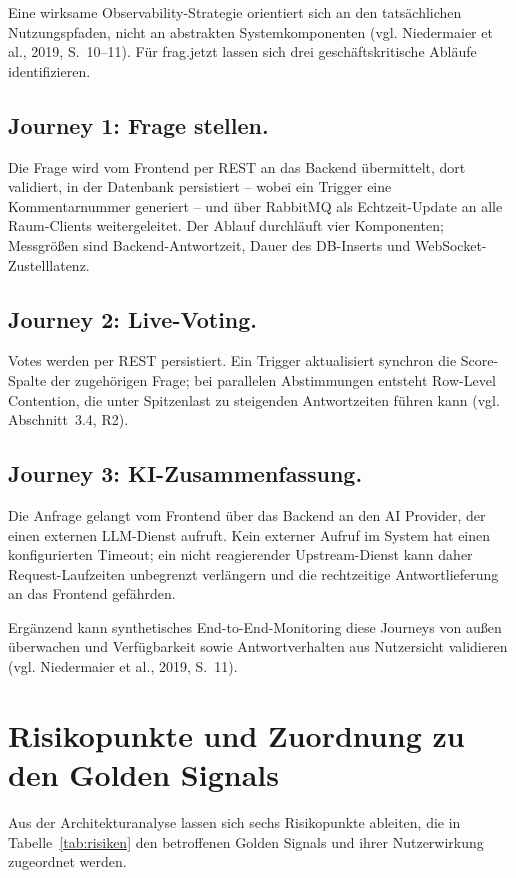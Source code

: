 Eine wirksame Observability-Strategie orientiert sich an den tatsächlichen Nutzungspfaden, nicht an abstrakten Systemkomponenten (vgl. Niedermaier et al., 2019, S.~10--11). Für frag.jetzt lassen sich drei geschäftskritische Abläufe identifizieren.
 
\subsection{Journey 1: Frage stellen.}
Die Frage wird vom Frontend per REST an das Backend übermittelt, dort validiert, in der Datenbank persistiert -- wobei ein Trigger eine Kommentarnummer generiert -- und über RabbitMQ als Echtzeit-Update an alle Raum-Clients weitergeleitet. Der Ablauf durchläuft vier Komponenten; Messgrößen sind Backend-Antwortzeit, Dauer des DB-Inserts und WebSocket-Zustelllatenz.
 
\subsection{Journey 2: Live-Voting.}
Votes werden per REST persistiert. Ein Trigger aktualisiert synchron die Score-Spalte der zugehörigen Frage; bei parallelen Abstimmungen entsteht Row-Level Contention, die unter Spitzenlast zu steigenden Antwortzeiten führen kann (vgl. Abschnitt~3.4, R2).
 
\subsection{Journey 3: KI-Zusammenfassung.}
Die Anfrage gelangt vom Frontend über das Backend an den AI Provider, der einen externen LLM-Dienst aufruft. Kein externer Aufruf im System hat einen konfigurierten Timeout; ein nicht reagierender Upstream-Dienst kann daher Request-Laufzeiten unbegrenzt verlängern und die rechtzeitige Antwortlieferung an das Frontend gefährden.
 
\medskip
 
Ergänzend kann synthetisches End-to-End-Monitoring diese Journeys von außen überwachen und Verfügbarkeit sowie Antwortverhalten aus Nutzersicht validieren (vgl. Niedermaier et al., 2019, S.~11).
 
 
\section{Risikopunkte und Zuordnung zu den Golden Signals}
 
Aus der Architekturanalyse lassen sich sechs Risikopunkte ableiten, die in Tabelle~\ref{tab:risiken} den betroffenen Golden Signals und ihrer Nutzerwirkung zugeordnet werden.
 
